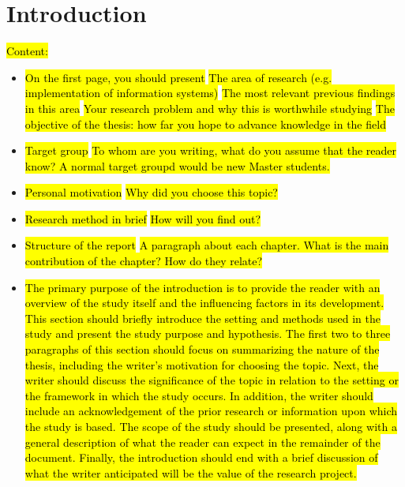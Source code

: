 \newpage
\section{Introduction}

\iffalse
\hl{Content:}
\begin{itemize}
    \item \hl{On the first page, you should present}
        \subitem \hl{The area of research (e.g. implementation of information systems)}
        \subitem \hl{The most relevant previous findings in this area}
        \subitem \hl{Your research problem and why this is worthwhile studying}
        \subitem \hl{The objective of the thesis: how far you hope to advance knowledge in the field}
    \item \hl{Target group}
        \subitem \hl{To whom are you writing, what do you assume that the reader know? A normal target groupd would be new Master students.}
    \item \hl{Personal motivation}
        \subitem \hl{Why did you choose this topic?}
    \item \hl{Research method in brief}
        \subitem \hl{How will you find out?}
    \item \hl{Structure of the report}
        \subitem \hl{A paragraph about each chapter. What is the main contribution of the chapter? How do they relate?}
\end{itemize}

\begin{itemize}
    \item \hl{The primary purpose of the introduction is to provide the reader with an overview of the study itself and the influencing factors in its development. This section should briefly introduce the setting and methods used in the study and present the study purpose and hypothesis. The first two to three paragraphs of this section should focus on summarizing the nature of the thesis, including the writer's motivation for choosing the topic. Next, the writer should discuss the significance of the topic in relation to the setting or the framework in which the study occurs. In addition, the writer should include an acknowledgement of the prior research or information upon which the study is based. The scope of the study should be presented, along with a general description of what the reader can expect in the remainder of the document. Finally, the introduction should end with a brief discussion of what the writer anticipated will be the value of the research project. }
\end{itemize}

